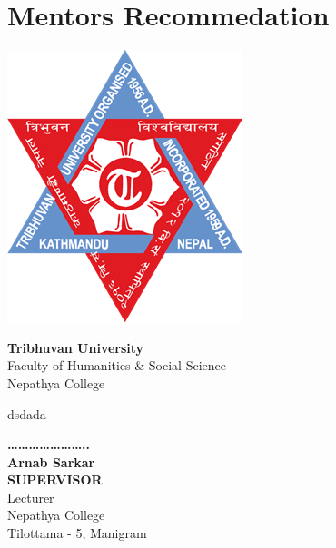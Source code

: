\chapter*{Mentors Recommedation}  %

\centering

\includegraphics[scale=0.3]{contents/frontmatter/images/tu-logo.png} \\ 
\vspace{1.5cm}


\begin{center}
    {\Large \textbf{Tribhuvan University}} \\  
    {\large Faculty of Humanities \& Social Science} \\  
    {\large Nepathya College}  
\end{center}

\vspace{1cm}  %


\noindent dsdada

\vspace{2cm}  %

\begin{flushleft}
    \textbf{…………………..} \\  
    \textbf{Arnab Sarkar} \\  
    \textbf{SUPERVISOR} \\  
    Lecturer \\  
    Nepathya College \\  
    Tilottama - 5, Manigram  
\end{flushleft}
